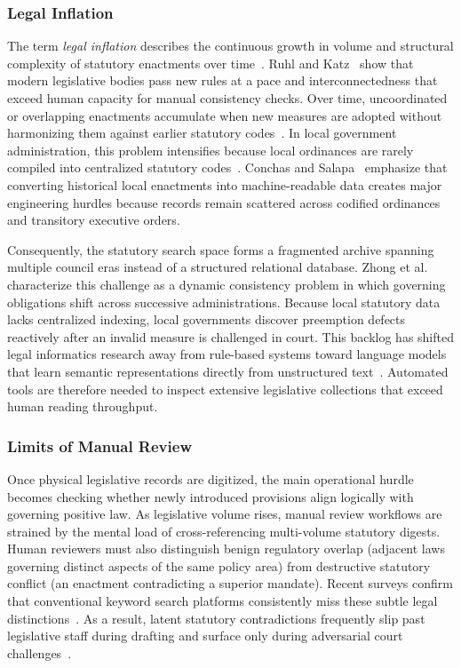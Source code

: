         \subsubsection{Legal Inflation}
        The term \textit{legal inflation} describes the continuous growth in volume and structural complexity of statutory enactments over time~\cite{ruhl2015measuring}. Ruhl and Katz~\cite{ruhl2015measuring} show that modern legislative bodies pass new rules at a pace and interconnectedness that exceed human capacity for manual consistency checks. Over time, uncoordinated or overlapping enactments accumulate when new measures are adopted without harmonizing them against earlier statutory codes~\cite{ruhl2015measuring}. In local government administration, this problem intensifies because local ordinances are rarely compiled into centralized statutory codes~\cite{conchas2025digital}. Conchas and Salapa~\cite{conchas2025digital} emphasize that converting historical local enactments into machine-readable data creates major engineering hurdles because records remain scattered across codified ordinances and transitory executive orders.

        Consequently, the statutory search space forms a fragmented archive spanning multiple council eras instead of a structured relational database. Zhong et al.~\cite{zhong2020how} characterize this challenge as a dynamic consistency problem in which governing obligations shift across successive administrations. Because local statutory data lacks centralized indexing, local governments discover preemption defects reactively after an invalid measure is challenged in court. This backlog has shifted legal informatics research away from rule-based systems toward language models that learn semantic representations directly from unstructured text~\cite{chalkidis2022lexglue}. Automated tools are therefore needed to inspect extensive legislative collections that exceed human reading throughput.

        \subsubsection{Limits of Manual Review}
        Once physical legislative records are digitized, the main operational hurdle becomes checking whether newly introduced provisions align logically with governing positive law. As legislative volume rises, manual review workflows are strained by the mental load of cross-referencing multi-volume statutory digests. Human reviewers must also distinguish benign regulatory overlap (adjacent laws governing distinct aspects of the same policy area) from destructive statutory conflict (an enactment contradicting a superior mandate). Recent surveys confirm that conventional keyword search platforms consistently miss these subtle legal distinctions~\cite{ariai2025natural}. As a result, latent statutory contradictions frequently slip past legislative staff during drafting and surface only during adversarial court challenges~\cite{ariai2025natural, scp1994magtajasvpryce}.

